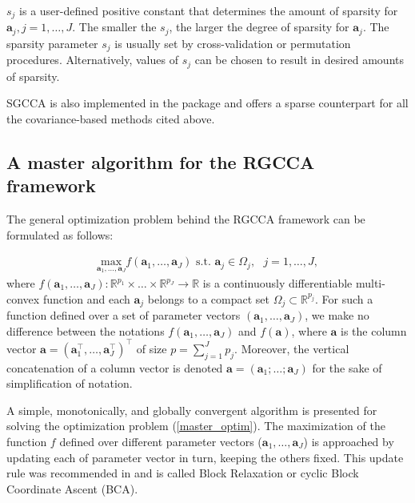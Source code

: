 \documentclass[
]{jss}
\begin{document}
\(s_j\) is a user-defined positive constant that determines the amount
of sparsity for \(\mathbf{a}_j, j=1, \ldots,J\). The smaller the
\(s_j\), the larger the degree of sparsity for \(\mathbf{a}_j\). The
sparsity parameter \(s_j\) is usually set by cross-validation or
permutation procedures. Alternatively, values of \(s_j\) can be chosen
to result in desired amounts of sparsity.

SGCCA is also implemented in the  package and offers a sparse
counterpart for all the covariance-based methods cited above.

\hypertarget{a-master-algorithm-for-the-rgcca-framework}{%
\subsection{A master algorithm for the RGCCA
framework}\label{a-master-algorithm-for-the-rgcca-framework}}

The general optimization problem behind the RGCCA framework can be
formulated as follows:

\begin{align}
\underset{ \mathbf a_1, \ldots, \mathbf a_J}{\text{max}} f( \mathbf a_1, \ldots, \mathbf a_J)
\text{ s.t. }  \mathbf a_j \in \Omega_j, \text{ } j = 1, \ldots, J,
\label{master_optim}
\end{align} where
\(f( \mathbf a_1, \ldots, \mathbf a_J):\mathbb{R}^{p_1}\times \ldots \times \mathbb{R}^{p_J} \xrightarrow{}\mathbb{R}\)
is a continuously differentiable multi-convex function and each
\(\mathbf a_j\) belongs to a compact set
\(\Omega_j \subset \mathbb{R}^{p_j}\). For such a function defined over
a set of parameter vectors \(( \mathbf a_1, \ldots, \mathbf a_J)\), we
make no difference between the notations
\(f( \mathbf a_1, \ldots, \mathbf a_J)\) and \(f( \mathbf a)\), where
\(\mathbf a\) is the column vector
\(\mathbf a = \left( \mathbf a_1^\top, \ldots, \mathbf a_J^\top\right)^\top\)
of size \(p = \sum_{j=1}^{J}p_j\). Moreover, the vertical concatenation
of a column vector is denoted
\(\mathbf a = \left( \mathbf a_1; \ldots; \mathbf a_J \right)\) for the
sake of simplification of notation.

A simple, monotonically, and globally convergent algorithm is presented
for solving the optimization problem (\ref{master_optim}). The
maximization of the function \(f\) defined over different parameter
vectors (\(\mathbf a_1, \ldots, \mathbf a_J\)) is approached by updating
each of parameter vector in turn, keeping the others fixed. This update
rule was recommended in \cite{DeLeeuw1994} and is called Block
Relaxation or cyclic Block Coordinate Ascent (BCA).
\end{document}
